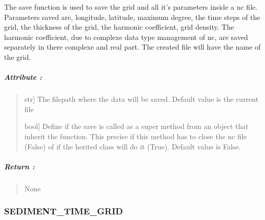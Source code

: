 \documentclass[letterpaper,10pt,english]{sphinxmanual}
\begin{document}
\begin{fulllineitems}
\label{\detokenize{GRID_doc/TIME_GRID_doc:SL_C0de.grid.TIME_GRID.save}}
\pysigstartsignatures
{}
\pysigstopsignatures
\sphinxAtStartPar
The \label{\detokenize{GRID_doc/TIME_GRID_doc:save}}save function is used to save the grid and all it’s parameters inside a nc file. Parameters saved are, longitude, latitude, maximum degree, the time steps of the grid, the thickness of the grid, the harmonic coefficient, grid density. The harmonic coefficient, due to complexe data type management of nc, are saved separately in there complexe and real part. The created file will have the name of the grid.


\subparagraph{Attribute :}
\label{\detokenize{GRID_doc/TIME_GRID_doc:id18}}\begin{quote}
\begin{description}
\sphinxlineitem{save\_way}{[}str{]}
\sphinxAtStartPar
The filepath where the data will be saved. Default value is the current file

\sphinxlineitem{supersave}{[}bool{]}
\sphinxAtStartPar
Define if the save is called as a super method from an object that inherit the function. This precise if this method has to close the nc file (False) of if the herited class will do it (True). Default value is False.

\end{description}
\end{quote}


\subparagraph{Return :}
\label{\detokenize{GRID_doc/TIME_GRID_doc:id19}}\begin{quote}

\sphinxAtStartPar
None
\end{quote}

\end{fulllineitems}


\sphinxstepscope


\subsubsection{SEDIMENT\_TIME\_GRID}
\label{\detokenize{GRID_doc/SEDIMENT_TIME_GRID_doc:sediment-time-grid}}\label{\detokenize{GRID_doc/SEDIMENT_TIME_GRID_doc::doc}}
\end{document}
